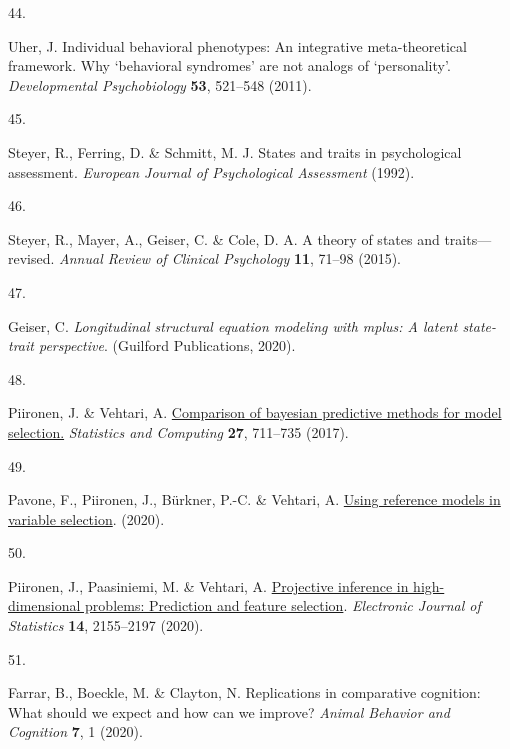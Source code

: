 \documentclass[
  man,floatsintext]{apa6}
\newlength{\cslhangindent}
\newlength{\csllabelwidth}
\newlength{\cslentryspacingunit} %
\newenvironment{CSLReferences}[2] %
 {%
  \setlength{\parindent}{0pt}
  \ifodd #1
  \let\oldpar\par
  \def\par{\hangindent=\cslhangindent\oldpar}
  \fi
  \setlength{\parskip}{#2\cslentryspacingunit}
 }%
 {}
\newcommand{\CSLLeftMargin}[1]{\parbox[t]{\csllabelwidth}{#1}}
\newcommand{\CSLRightInline}[1]{\parbox[t]{\linewidth - \csllabelwidth}{#1}\break}
\begin{document}
\begin{CSLReferences}{0}{0}
\leavevmode{}%
\CSLLeftMargin{44. }%
\CSLRightInline{Uher, J. Individual behavioral phenotypes: An integrative meta-theoretical framework. Why {`behavioral syndromes'} are not analogs of {`personality'}. \emph{Developmental Psychobiology} \textbf{53}, 521--548 (2011).}

\leavevmode{}%
\CSLLeftMargin{45. }%
\CSLRightInline{Steyer, R., Ferring, D. \& Schmitt, M. J. States and traits in psychological assessment. \emph{European Journal of Psychological Assessment} (1992).}

\leavevmode{}%
\CSLLeftMargin{46. }%
\CSLRightInline{Steyer, R., Mayer, A., Geiser, C. \& Cole, D. A. A theory of states and traits---revised. \emph{Annual Review of Clinical Psychology} \textbf{11}, 71--98 (2015).}

\leavevmode{}%
\CSLLeftMargin{47. }%
\CSLRightInline{Geiser, C. \emph{Longitudinal structural equation modeling with mplus: A latent state-trait perspective}. (Guilford Publications, 2020).}

\leavevmode{}%
\CSLLeftMargin{48. }%
\CSLRightInline{Piironen, J. \& Vehtari, A. \href{https://doi.org/10.1007/s11222-016-9649-y}{Comparison of bayesian predictive methods for model selection.} \emph{Statistics and Computing} \textbf{27}, 711--735 (2017).}

\leavevmode{}%
\CSLLeftMargin{49. }%
\CSLRightInline{Pavone, F., Piironen, J., Bürkner, P.-C. \& Vehtari, A. \href{https://arxiv.org/abs/2004.13118}{Using reference models in variable selection}. (2020).}

\leavevmode{}%
\CSLLeftMargin{50. }%
\CSLRightInline{Piironen, J., Paasiniemi, M. \& Vehtari, A. \href{https://doi.org/10.1214/20-EJS1711}{{Projective inference in high-dimensional problems: Prediction and feature selection}}. \emph{Electronic Journal of Statistics} \textbf{14}, 2155--2197 (2020).}

\leavevmode{}%
\CSLLeftMargin{51. }%
\CSLRightInline{Farrar, B., Boeckle, M. \& Clayton, N. Replications in comparative cognition: What should we expect and how can we improve? \emph{Animal Behavior and Cognition} \textbf{7}, 1 (2020).}


\end{CSLReferences}
\end{document}
